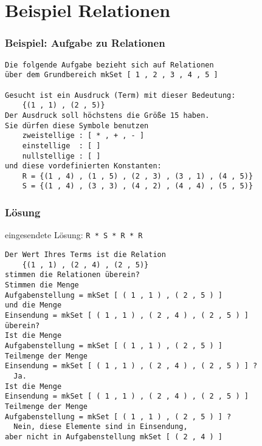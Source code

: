 \section{Beispiel Relationen}
\begin{frame}[fragile]
  \frametitle{Beispiel: Aufgabe zu Relationen}
  { \small
\begin{verbatim}
Die folgende Aufgabe bezieht sich auf Relationen
über dem Grundbereich mkSet [ 1 , 2 , 3 , 4 , 5 ]

Gesucht ist ein Ausdruck (Term) mit dieser Bedeutung:
    {(1 , 1) , (2 , 5)}
Der Ausdruck soll höchstens die Größe 15 haben.
Sie dürfen diese Symbole benutzen
    zweistellige : [ * , + , - ]
    einstellige  : [ ]
    nullstellige : [ ]
und diese vordefinierten Konstanten:
    R = {(1 , 4) , (1 , 5) , (2 , 3) , (3 , 1) , (4 , 5)}
    S = {(1 , 4) , (3 , 3) , (4 , 2) , (4 , 4) , (5 , 5)}
\end{verbatim}
  }  
\end{frame}
\begin{frame}[fragile]
  \frametitle{Lösung}
  {\small
    eingesendete Lösung: \verb|R * S * R * R|
\begin{verbatim}
Der Wert Ihres Terms ist die Relation
    {(1 , 1) , (2 , 4) , (2 , 5)}
stimmen die Relationen überein?
Stimmen die Menge
Aufgabenstellung = mkSet [ ( 1 , 1 ) , ( 2 , 5 ) ]
und die Menge
Einsendung = mkSet [ ( 1 , 1 ) , ( 2 , 4 ) , ( 2 , 5 ) ]
überein?
Ist die Menge
Aufgabenstellung = mkSet [ ( 1 , 1 ) , ( 2 , 5 ) ]
Teilmenge der Menge
Einsendung = mkSet [ ( 1 , 1 ) , ( 2 , 4 ) , ( 2 , 5 ) ] ?
  Ja.
Ist die Menge
Einsendung = mkSet [ ( 1 , 1 ) , ( 2 , 4 ) , ( 2 , 5 ) ]
Teilmenge der Menge
Aufgabenstellung = mkSet [ ( 1 , 1 ) , ( 2 , 5 ) ] ?
  Nein, diese Elemente sind in Einsendung, 
aber nicht in Aufgabenstellung mkSet [ ( 2 , 4 ) ]
\end{verbatim}






  }
\end{frame}
